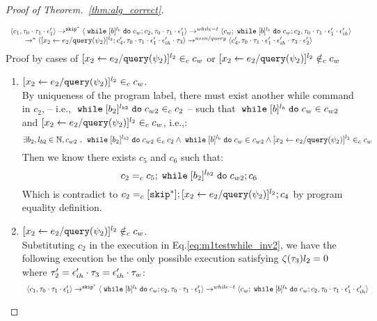 \begin{proof}[Proof of Theorem.~\ref{thm:alg_correct}]
\begin{case}
\begin{subcase}
\begin{subsubcase}
\begin{subsubsubcase}
\begin{subproof}
\begin{equation}
\begin{array}{l}
  \langle c_1, \mathtt{\tau}_0 \cdot \mathtt{\tau}_1 \cdot \mathtt{\epsilon}_1' \rangle 
  \rightarrow^{\mathtt{skip}^*} 
  \langle \;\mathtt{while}\; [b]^{l_b} \;\mathtt{do}\; c_w;{c}_2, \mathtt{\tau}_0 \cdot \mathtt{\tau}_1 \cdot \mathtt{\epsilon}_1' \rangle 
  \rightarrow^{while-t} 
  \langle c_w;\;\mathtt{while}\; [b]^{l_b} \;\mathtt{do}\; c_w;c_2, \mathtt{\tau}_0 \cdot \mathtt{\tau}_1 \cdot \mathtt{\epsilon}_1' \cdot \mathtt{\epsilon}_{ih}' \rangle 
  \\
  \qquad \rightarrow^{*} 
  \langle [\mathrel{ {x}_2 \leftarrow e_2 / {\tt query}(\psi_2) }]^{l_2};{c}_4', 
  \mathtt{\tau}_0 \cdot \mathtt{\tau}_1 \cdot \mathtt{\epsilon}_1' \cdot \mathtt{\epsilon}_{ih}' \cdot \mathtt{\tau}_3 \rangle
  \rightarrow^{assn/query} 
  \langle {c}_4',  \mathtt{\tau}_0 \cdot \mathtt{\tau}_1 \cdot \mathtt{\epsilon}_1' \cdot \mathtt{\epsilon}_{ih}' \cdot \mathtt{\tau}_3 \cdot \mathtt{\epsilon}_2' \rangle 
\end{array}
\end{equation}
%
Proof by cases of $[\mathrel{ {x}_2 \leftarrow e_2 / {\tt query}(\psi_2) }]^{l_2} \in_c c_w$ or 
$[\mathrel{ {x}_2 \leftarrow e_2 / {\tt query}(\psi_2) }]^{l_2} \notin_c c_w$
\begin{enumerate}
  \item $[\mathrel{ {x}_2 \leftarrow e_2 / {\tt query}(\psi_2) }]^{l_2} \in_c c_w$.
  \\
  By uniqueness of the program label, there must exist another while command in $c_2$, -- i.e., $\;\mathtt{while}\; [b_2]^{l_{b2}} \;\mathtt{do}\; c_{w2} \in_c c_2$ --
    such that 
  $\;\mathtt{while}\; [b]^{l_b} \;\mathtt{do}\; c_w \in c_{w2}$ and $[\mathrel{ {x}_2 \leftarrow e_2 / {\tt query}(\psi_2) }]^{l_2} \in_c c_w$, i.e.,:
  \[
  \exists b_2, l_{b2} \in \mathbb{N}, c_{w2} ~.~ 
  \;\mathtt{while}\; [b_2]^{l_{b2}} \;\mathtt{do}\; c_{w2} \in_c c_2 
  \land \;\mathtt{while}\; [b]^{l_b} \;\mathtt{do}\; c_w \in c_{w2}
  \land [\mathrel{ {x}_2 \leftarrow e_2 / {\tt query}(\psi_2) }]^{l_2} \in_c c_w
  \]
%
Then we know there exists $c_5$ and $c_6$ such that:
\[
  c_2 =_c c_5; \;\mathtt{while}\; [b_2]^{l_{b2}} \;\mathtt{do}\; c_{w2};c_6
\]
Which is contradict to $c_2 =_c [\mathtt{skip}^*];[\mathrel{ {x}_2 \leftarrow e_2 / {\tt query}(\psi_2) }]^{l_2};{c}_4$ by program equality definition.
%
%
 \item $[\mathrel{ {x}_2 \leftarrow e_2 / {\tt query}(\psi_2) }]^{l_2} \notin_c c_w$.
%
\\
%
Substituting $c_2$ in the execution in Eq.\ref{eq:m1testwhile_inv2}, we have the following execution be the only possible execution satisfying $\mathtt{\zeta}(\mathtt{\tau}_3) l_2 = 0$ where $\mathtt{\tau}_2' = \mathtt{\epsilon}_{ih}' \cdot \mathtt{\tau}_3 = \mathtt{\epsilon}_{ih}' \cdot \mathtt{\tau}_w$:
\[
    \begin{array}{l}   
  \langle c_1, \mathtt{\tau}_0 \cdot \mathtt{\tau}_1 \cdot \mathtt{\epsilon}_1' \rangle 
  \rightarrow^{\mathtt{skip}^*} 
  \langle \;\mathtt{while}\; [b]^{l_b} \;\mathtt{do}\; c_w;{c}_2, \mathtt{\tau}_0 \cdot \mathtt{\tau}_1 \cdot \mathtt{\epsilon}_1' \rangle 
  \rightarrow^{while-t} 
  \langle c_w;\;\mathtt{while}\; [b]^{l_b} \;\mathtt{do}\; c_w;c_2, \mathtt{\tau}_0 \cdot \mathtt{\tau}_1 \cdot \mathtt{\epsilon}_1' \cdot \mathtt{\epsilon}_{ih}' \rangle 

\end{array}\]
\end{enumerate}
\end{subproof}
\end{subsubsubcase}
\end{subsubcase}
\end{subcase}
\end{case}
\end{proof}

